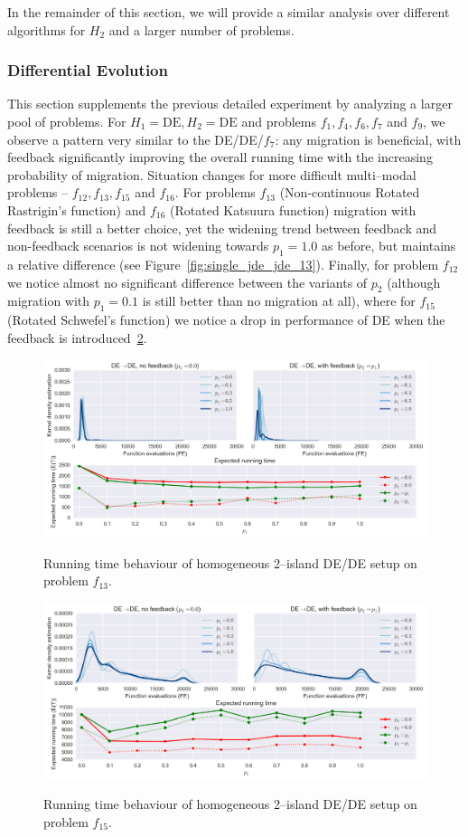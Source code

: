 \documentclass{sig-alternate}
\begin{document}
In the remainder of this section, we will provide a similar analysis over different algorithms for $H_2$ and a larger number of problems.

\subsubsection{Differential Evolution}
This section supplements the previous detailed experiment by analyzing a larger pool of problems.
For $H_1 =\mbox{DE}, H_2=\mbox{DE}$ and problems $f_1, f_4, f_6, f_7$ and $f_9$, we observe a pattern very similar to the DE/DE/$f_7$: any migration is beneficial, with feedback significantly improving the overall running time with the increasing probability of migration.
Situation changes for more difficult multi--modal problems -- $f_{12}, f_{13}, f_{15}$ and $f_{16}$.
For problems $f_{13}$ (Non-continuous Rotated Rastrigin's function) and $f_{16}$ (Rotated Katsuura function) migration with feedback is still a better choice, yet the widening trend between feedback and non-feedback scenarios is not widening towards $p_1 = 1.0$ as before, but maintains a relative difference (see Figure~\ref{fig:single_jde_jde_13}).
Finally, for problem $f_{12}$ we notice almost no significant difference between the variants of $p_2$ (although migration with $p_1=0.1$ is still better than no migration at all), where for $f_{15}$ (Rotated Schwefel's function) we notice a drop in performance of DE when the feedback is introduced~\ref{fig:single_jde_jde_15}.
\begin{figure}[ht]
  \centering
  \includegraphics[width=\columnwidth]{figures/single_jde_jde_cec_13.png}
  \label{fig:single_jde_jde_16}
 \caption{Running time behaviour of homogeneous 2--island DE/DE setup on problem $f_{13}$.}
\end{figure}
\begin{figure}[ht]
  \centering
  \includegraphics[width=\columnwidth]{figures/single_jde_jde_cec_15.png}
  \label{fig:single_jde_jde_15}
 \caption{Running time behaviour of homogeneous 2--island DE/DE setup on problem $f_{15}$.}
\end{figure}
\end{document}
